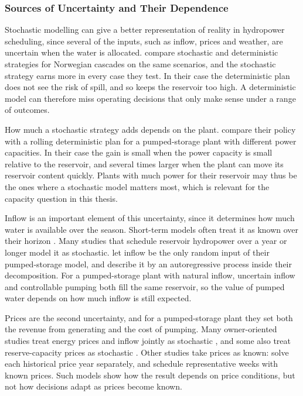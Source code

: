 
\subsubsection{Sources of Uncertainty and Their Dependence}
\label{sec:lit_unc_sources}

Stochastic modelling can give a better representation of reality in hydropower
scheduling, since several of the inputs, such as inflow, prices and weather,
are uncertain when the water is allocated. \citet{belsnes2016applying} compare stochastic and deterministic
strategies for Norwegian cascades on the same scenarios, and the stochastic
strategy earns more in every case they test. In their case the deterministic
plan does not see the risk of spill, and so keeps the reservoir too high. A
deterministic model can therefore miss operating decisions that only make
sense under a range of outcomes.

How much a stochastic strategy adds depends on the plant.
\citet{lohndorf2013} compare their policy with a rolling deterministic plan
for a pumped-storage plant with different power capacities. In their case the
gain is small when the power capacity is small relative to the reservoir, and
several times larger when the plant can move its reservoir content quickly.
Plants with much power for their reservoir may thus be the ones where a
stochastic model matters most, which is relevant for the capacity question
in this thesis.

Inflow is an important element of this uncertainty, since it determines how
much water is available over the season. Short-term models often treat it as
known over their horizon \citep{faria2011day}. Many studies that schedule
reservoir hydropower over a year or longer model it as stochastic.
\citet{abgottspon2013stochastic} let inflow be the only random input of their
pumped-storage model, and \citet{helseth2016} describe it by an autoregressive
process inside their decomposition. For a pumped-storage plant with natural
inflow, uncertain inflow and controllable pumping both fill the same
reservoir, so the value of pumped water depends on how much inflow is still
expected.

Prices are the second uncertainty, and for a pumped-storage plant they set
both the revenue from generating and the cost of pumping. Many owner-oriented
studies treat energy prices and inflow jointly as stochastic
\citep{lohndorf2013,helseth2016,kleiven2023,bore2026assessing}, and some also
treat reserve-capacity prices as stochastic \citep{helseth2016,helseth2017iet}.
Other studies take prices as known: \citet{ak2019quantifying} solve each
historical price year separately, and \citet{chazarra2017} schedule
representative weeks with known prices. Such models show how the result
depends on price conditions, but not how decisions adapt as prices become
known.

